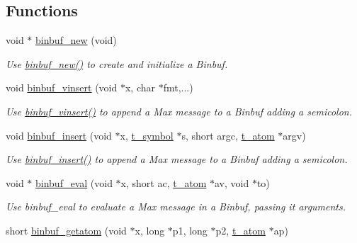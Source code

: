 \subsection*{Functions}
\begin{DoxyCompactItemize}
\item 
void $\ast$ \hyperlink{group__binbuf_ga4a6b741be0bee8626b4cb25baa453060}{binbuf\_\-new} (void)
\begin{DoxyCompactList}\small\item\em Use \hyperlink{group__binbuf_ga4a6b741be0bee8626b4cb25baa453060}{binbuf\_\-new()} to create and initialize a Binbuf. \item\end{DoxyCompactList}\item 
void \hyperlink{group__binbuf_ga8bc71e59211549a9927754452b2d9e21}{binbuf\_\-vinsert} (void $\ast$x, char $\ast$fmt,...)
\begin{DoxyCompactList}\small\item\em Use \hyperlink{group__binbuf_ga8bc71e59211549a9927754452b2d9e21}{binbuf\_\-vinsert()} to append a Max message to a Binbuf adding a semicolon. \item\end{DoxyCompactList}\item 
void \hyperlink{group__binbuf_gad8f2272c95a8e89f22f1a9c67272af5e}{binbuf\_\-insert} (void $\ast$x, \hyperlink{structt__symbol}{t\_\-symbol} $\ast$s, short argc, \hyperlink{structt__atom}{t\_\-atom} $\ast$argv)
\begin{DoxyCompactList}\small\item\em Use \hyperlink{group__binbuf_gad8f2272c95a8e89f22f1a9c67272af5e}{binbuf\_\-insert()} to append a Max message to a Binbuf adding a semicolon. \item\end{DoxyCompactList}\item 
void $\ast$ \hyperlink{group__binbuf_ga90c960507452ce76428d87c0714f9f0e}{binbuf\_\-eval} (void $\ast$x, short ac, \hyperlink{structt__atom}{t\_\-atom} $\ast$av, void $\ast$to)
\begin{DoxyCompactList}\small\item\em Use binbuf\_\-eval to evaluate a Max message in a Binbuf, passing it arguments. \item\end{DoxyCompactList}\item 
short \hyperlink{group__binbuf_ga0eccee2d50ae561c625cc97238f1e21a}{binbuf\_\-getatom} (void $\ast$x, long $\ast$p1, long $\ast$p2, \hyperlink{structt__atom}{t\_\-atom} $\ast$ap)

\end{DoxyCompactItemize}
